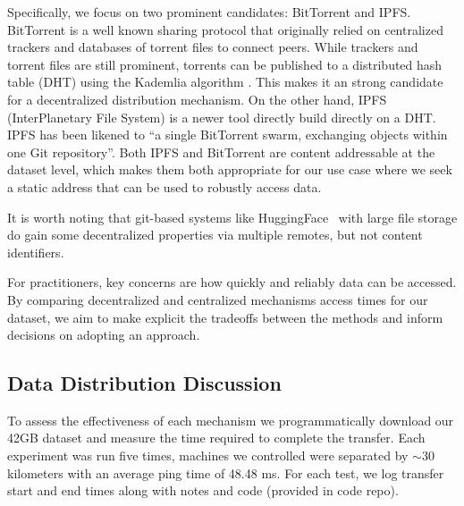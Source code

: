 Specifically, we focus on two prominent candidates:
BitTorrent and IPFS.
BitTorrent \cite{cohen_incentives_2003, cohen_bittorrent_2017} is a well known sharing protocol that
  originally relied on centralized trackers and databases of torrent files to connect peers.
While trackers and torrent files are still prominent, torrents can be published to a distributed hash table
  (DHT) using the Kademlia algorithm \cite{maymounkov_kademlia_2002}.
This makes it an strong candidate for a decentralized distribution mechanism.
On the other hand, IPFS (InterPlanetary File System) \cite{benet_ipfs_2014, bieri_overview_2021} is a newer
  tool directly build directly on a DHT.
IPFS has been likened to ``a single BitTorrent swarm, exchanging objects within one Git repository''.
Both IPFS and BitTorrent are content addressable at the dataset level, which makes them both appropriate for
  our use case where we seek a static address that can be used to robustly access data.

It is worth noting that git-based \cite{chacon2014progit} systems like
  HuggingFace~\cite{huggingface_datasets} with large file storage do gain some decentralized
  properties via multiple remotes, but not content identifiers.

For practitioners, key concerns are how quickly and reliably data can be accessed.
By comparing decentralized and centralized mechanisms access times for our dataset, we aim to make
  explicit the tradeoffs between the methods and inform decisions on adopting an approach.



 

\subsection{Data Distribution Discussion}
\label{sec:datset_discuss}

To assess the effectiveness of each mechanism we programmatically download our 42GB dataset and measure the
  time required to complete the transfer.
Each experiment was run five times, machines we controlled were separated by $\sim\!30$ kilometers with an
  average ping time of 48.48 ms.
For each test, we log transfer start and end times along with notes and code (provided in code repo).

